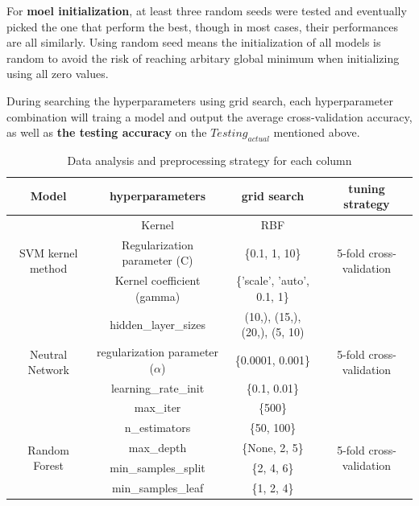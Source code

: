 For \textbf{moel initialization}, at least three random seeds were tested and eventually picked the one that perform the best, though in most cases, their performances are all similarly. Using random seed means the initialization of all models is random to avoid the risk of reaching arbitary global minimum when initializing using all zero values. 

During searching the hyperparameters using grid search, each hyperparameter combination will traing a model and output the average cross-validation accuracy, as well as \textbf{the testing accuracy} on the \textbf{$Testing_{actual}$} mentioned above.

\begin{table}[H]
    \centering
    \begin{tabular}{|c|c|c|c|}
        \hline 
        Model       & hyperparameters & grid search & tuning strategy \\
        \hline
        \multirow{3}{*}{SVM kernel method}   &  Kernel & RBF & \multirow{3}{*}{5-fold cross-validation } \\
                                              &  Regularization parameter (C)  & \{0.1, 1, 10\}  &        \\
                                              &  Kernel coefficient (gamma)  & \{'scale', 'auto', 0.1, 1\}  &     \\ 
        \hline
        \multirow{4}{*}{Neutral Network} & hidden\_layer\_sizes  & (10,), (15,), (20,), (5, 10) & \multirow{4}{*}{5-fold cross-validation} \\
                        & regularization parameter ($\alpha$)   & \{0.0001, 0.001\} & \\
                        & learning\_rate\_init & \{0.1, 0.01\}& \\
                        & max\_iter & \{500\} & \\
        \hline
        \multirow{4}{*}{Random Forest}   &  n\_estimators & \{50, 100\} & \multirow{4}{*}{5-fold cross-validation} \\
                                              &  max\_depth  & \{None, 2, 5\}  &        \\
                                              &  min\_samples\_split  & \{2, 4, 6\}  &     \\
                                              & min\_samples\_leaf & \{1, 2, 4\} & \\
 
        \hline
    \end{tabular}
    \caption{Data analysis and preprocessing strategy for each column}
    \label{Model selection and hyperparameters tuning strategies}
\end{table}

